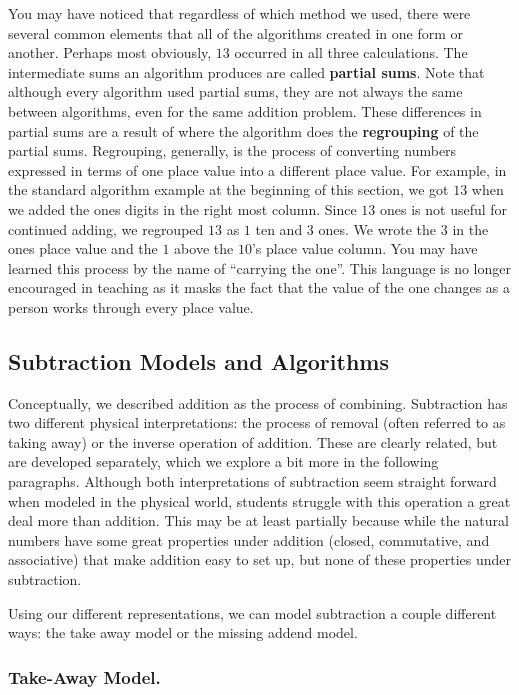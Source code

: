 \documentclass[
]{book}
\theoremstyle{definition}
\theoremstyle{definition}
\theoremstyle{definition}
\theoremstyle{remark}
\begin{document}
You may have noticed that regardless of which method we used, there were several common elements that all of the algorithms created in one form or another. Perhaps most obviously, \(13\) occurred in all three calculations. The intermediate sums an algorithm produces are called \textbf{partial sums}. Note that although every algorithm used partial sums, they are not always the same between algorithms, even for the same addition problem. These differences in partial sums are a result of where the algorithm does the \textbf{regrouping} of the partial sums. Regrouping, generally, is the process of converting numbers expressed in terms of one place value into a different place value. For example, in the standard algorithm example at the beginning of this section, we got \(13\) when we added the ones digits in the right most column. Since \(13\) ones is not useful for continued adding, we regrouped \(13\) as \(1\) ten and \(3\) ones. We wrote the \(3\) in the ones place value and the \(1\) above the \(10\)'s place value column. You may have learned this process by the name of ``carrying the one''. This language is no longer encouraged in teaching as it masks the fact that the value of the one changes as a person works through every place value.

\hypertarget{subtraction-models-and-algorithms}{%
\subsection{Subtraction Models and Algorithms}\label{subtraction-models-and-algorithms}}

Conceptually, we described addition as the process of combining. Subtraction has two different physical interpretations: the process of removal (often referred to as taking away) or the inverse operation of addition. These are clearly related, but are developed separately, which we explore a bit more in the following paragraphs. Although both interpretations of subtraction seem straight forward when modeled in the physical world, students struggle with this operation a great deal more than addition. This may be at least partially because while the natural numbers have some great properties under addition (closed, commutative, and associative) that make addition easy to set up, but none of these properties under subtraction.

Using our different representations, we can model subtraction a couple different ways: the take away model or the missing addend model.

\hypertarget{take-away-model.}{%
\subsubsection*{Take-Away Model.}\label{take-away-model.}}
\end{document}
